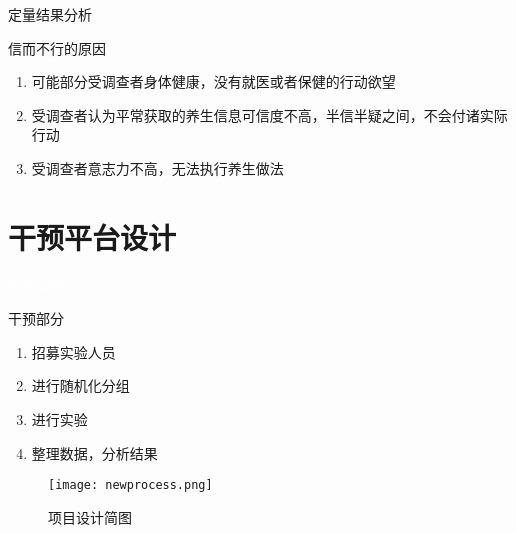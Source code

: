 \begin{frame}[allowframebreaks]{定量结果分析}
\begin{exampleblock}{信而不行的原因}
    \begin{enumerate}
        \item 可能部分受调查者身体健康，没有就医或者保健的行动欲望
        \item 受调查者认为平常获取的养生信息可信度不高，半信半疑之间，不会付诸实际行动
        \item 受调查者意志力不高，无法执行养生做法
    \end{enumerate}
\end{exampleblock}
\end{frame}
\section{干预平台设计}
\begin{frame}[plain, b]

\centering
\huge \textcolor{white}{如何实验？}
\normalsize

\vspace*{\fill}


\end{frame}

\begin{frame}{干预部分}
\begin{enumerate}
    \item 招募实验人员
    \item 进行随机化分组
    \item 进行实验
    \item 整理数据，分析结果
\end{enumerate}
\begin{figure}[th]
    \texttt{[image: newprocess.png]}
    \centering
    \caption{项目设计简图}
\end{figure}
\end{frame}

